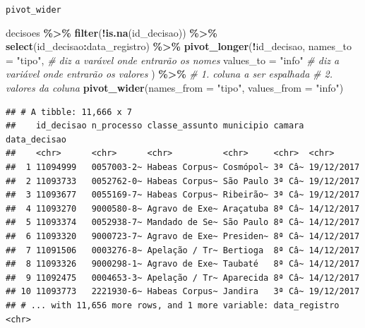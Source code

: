 \documentclass[
  9pt,
  ignorenonframetext,
]{beamer}
\newenvironment{Shaded}{\begin{snugshade}}{\end{snugshade}}
\newcommand{\CommentTok}[1]{\textcolor[rgb]{0.56,0.35,0.01}{\textit{#1}}}
\newcommand{\DataTypeTok}[1]{\textcolor[rgb]{0.13,0.29,0.53}{#1}}
\newcommand{\KeywordTok}[1]{\textcolor[rgb]{0.13,0.29,0.53}{\textbf{#1}}}
\newcommand{\NormalTok}[1]{#1}
\newcommand{\OperatorTok}[1]{\textcolor[rgb]{0.81,0.36,0.00}{\textbf{#1}}}
\newcommand{\StringTok}[1]{\textcolor[rgb]{0.31,0.60,0.02}{#1}}
\begin{document}
\begin{frame}[fragile]{\texttt{pivot\_wider}}
\protect\hypertarget{pivot_wider}{}
\begin{Shaded}
\begin{Highlighting}[]
\NormalTok{decisoes }\OperatorTok{\%\textgreater{}\%}\StringTok{ }
\StringTok{  }\KeywordTok{filter}\NormalTok{(}\OperatorTok{!}\KeywordTok{is.na}\NormalTok{(id\_decisao)) }\OperatorTok{\%\textgreater{}\%}\StringTok{ }
\StringTok{  }\KeywordTok{select}\NormalTok{(id\_decisao}\OperatorTok{:}\NormalTok{data\_registro) }\OperatorTok{\%\textgreater{}\%}\StringTok{ }
\StringTok{  }\KeywordTok{pivot\_longer}\NormalTok{(}\OperatorTok{!}\NormalTok{id\_decisao, }
               \DataTypeTok{names\_to =} \StringTok{"tipo"}\NormalTok{, }\CommentTok{\# diz a varável onde entrarão os nomes}
               \DataTypeTok{values\_to =} \StringTok{"info"} \CommentTok{\# diz a variável onde entrarão os valores}
\NormalTok{               ) }\OperatorTok{\%\textgreater{}\%}\StringTok{ }
\StringTok{  }\CommentTok{\# 1. coluna a ser espalhada}
\StringTok{  }\CommentTok{\# 2. valores da coluna}
\StringTok{  }\KeywordTok{pivot\_wider}\NormalTok{(}\DataTypeTok{names\_from =} \StringTok{"tipo"}\NormalTok{,}
              \DataTypeTok{values\_from =} \StringTok{"info"}\NormalTok{)}
\end{Highlighting}
\end{Shaded}

\begin{verbatim}
## # A tibble: 11,666 x 7
##    id_decisao n_processo classe_assunto municipio camara data_decisao
##    <chr>      <chr>      <chr>          <chr>     <chr>  <chr>       
##  1 11094999   0057003-2~ Habeas Corpus~ Cosmópol~ 3ª Câ~ 19/12/2017  
##  2 11093733   0052762-0~ Habeas Corpus~ São Paulo 3ª Câ~ 19/12/2017  
##  3 11093677   0055169-7~ Habeas Corpus~ Ribeirão~ 3ª Câ~ 19/12/2017  
##  4 11093270   9000580-8~ Agravo de Exe~ Araçatuba 8ª Câ~ 14/12/2017  
##  5 11093374   0052938-7~ Mandado de Se~ São Paulo 8ª Câ~ 14/12/2017  
##  6 11093320   9000723-7~ Agravo de Exe~ Presiden~ 8ª Câ~ 14/12/2017  
##  7 11091506   0003276-8~ Apelação / Tr~ Bertioga  8ª Câ~ 14/12/2017  
##  8 11093326   9000298-1~ Agravo de Exe~ Taubaté   8ª Câ~ 14/12/2017  
##  9 11092475   0004653-3~ Apelação / Tr~ Aparecida 8ª Câ~ 14/12/2017  
## 10 11093773   2221930-6~ Habeas Corpus~ Jandira   3ª Câ~ 19/12/2017  
## # ... with 11,656 more rows, and 1 more variable: data_registro <chr>
\end{verbatim}
\end{frame}
\end{document}
